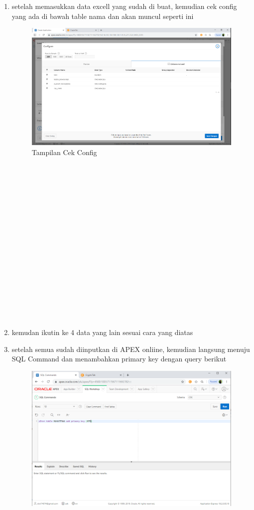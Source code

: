 \documentclass{article}
\begin{document}
\begin{enumerate}
	\item setelah memasukkan data excell yang sudah di buat, kemudian cek config yang ada di bawah table nama dan akan muncul seperti ini
	\begin{figure}[h]
	\centering
		\includegraphics[scale=0.5]{gambar/7.PNG}
		\caption{Tampilan Cek Config}
\end{figure}
  \\
\\
\\
\\
\\
\\
\\
\\
\\
\\
\\
\\
\\
\\
\\
\\
	\item kemudan ikutin ke 4 data yang lain sesuai cara yang diatas
	\item setelah semua sudah diinputkan di APEX onliine, kemudian langsung menuju SQL Command dan menambahkan primary key dengan query berikut
	\begin{figure}[h]
	\centering
		\includegraphics[scale=0.5]{gambar/9.PNG}

\end{figure}
\end{enumerate}
\end{document}
